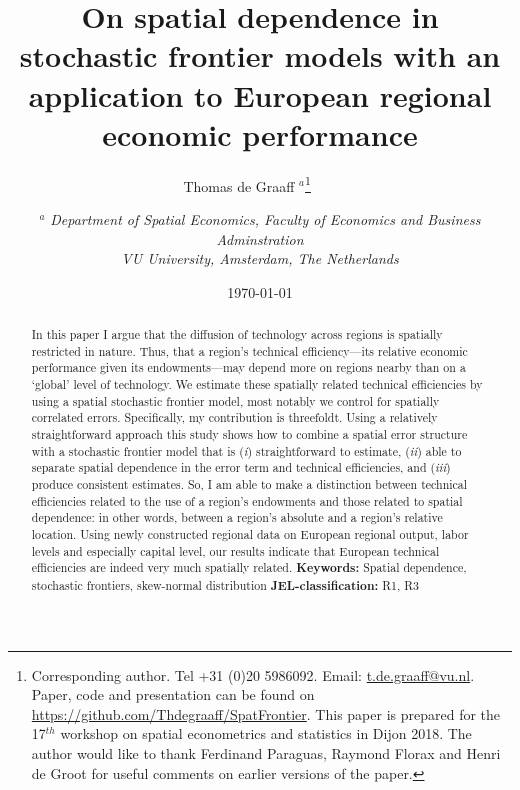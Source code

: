 \documentclass[11pt,parskip,abstracton,notitlepage]{scrartcl}
\begin{document}
%

\title{\bfseries On spatial dependence in stochastic frontier models with an application to European regional economic performance}
\author{Thomas de Graaff $^{a}$\thanks{Corresponding author. Tel +31 (0)20
    5986092. Email: \href{t.de.graaff@vu.nl}{t.de.graaff@vu.nl}. Paper, code and presentation can be found
    on
    \href{https://github.com/Thdegraaff/SpatFrontier}{https://github.com/Thdegraaff/SpatFrontier}.
    This paper is prepared for the 17$^{th}$ workshop on spatial econometrics and statistics in Dijon 2018. The author would like to thank Ferdinand Paraguas, Raymond Florax and Henri de Groot for useful comments on earlier versions of the paper.} \bigskip \ \ \ 
\and 
{\small {$^{a}$ \emph{Department of Spatial Economics, Faculty of Economics and Business Adminstration}}} \\
{\small {\emph{VU University, Amsterdam, The Netherlands}}} \bigskip \\
}

\date{\today}
\maketitle
\clearpage

\begin{abstract}
\noindent In this paper I argue that the diffusion of technology across regions
is spatially restricted in nature. Thus, that a region's technical
efficiency---its relative economic performance given its endowments---may depend
more on regions nearby than on a `global' level of technology. We estimate these
spatially related technical efficiencies by using a spatial stochastic frontier
model, most notably we control for spatially correlated errors. Specifically, my
contribution is threefoldt.  Using a relatively straightforward approach this
study shows how to combine a spatial error structure with a stochastic frontier
model that is (\emph{i}) straightforward to estimate, (\emph{ii}) able to
separate spatial dependence in the error term and technical efficiencies, and
(\emph{iii}) produce consistent estimates. So, I am able to make a distinction between technical efficiencies related to the use of a region's endowments and those related to spatial dependence: in other words, between a region's absolute and a region's relative location. Using newly constructed regional data on European regional output, labor levels and especially capital level, our results indicate that European technical efficiencies are indeed very much spatially related.
\noindent 
\newline
\newline
{\small \textbf{Keywords:} Spatial dependence, stochastic frontiers, skew-normal distribution \newline
\textbf{JEL-classification:} R1, R3}
\end{abstract}
\thispagestyle{empty}
\end{document}

